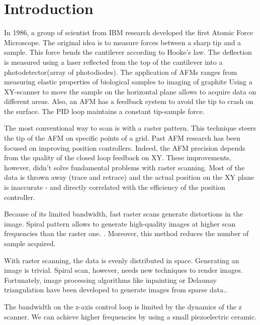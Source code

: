 \chapter{Introduction}

In 1986, a group of scientist from IBM research developed the first Atomic Force Microscope.\cite{binnig1986atomic} The original idea is to measure forces between a sharp tip and a sample. This force bends the cantilever according to Hooke's law. The deflection is measured using a laser reflected from the top of the cantilever into a photodetector(array of photodiodes). The application of AFMs ranges from measuring elastic properties of biological samples to imaging of graphite\cite{radmacher1997measuring} \cite{hansma1988scanning}
Using a XY-scanner to move the sample on the horizontal plane allows to acquire data on different areas. Also, an AFM has a feedback system to avoid the tip to crash on the surface. The PID loop maintains a constant tip-sample force. 

The most conventional way to scan is with a raster pattern. This technique steers the tip of the AFM on specific points of a grid. Past AFM research has been focused on improving position controllers. Indeed, the AFM precision depends from the quality of the closed loop feedback on XY. These improvements, however, didn't solve fundamental problems with raster scanning. Most of the data is thrown away (trace and retrace) and the actual position on the XY plane is inaccurate - and directly correlated with the efficiency of the position controller.

Because of its limited bandwidth, fast raster scans generate distortions in the image.\cite{yong2010high} Spiral pattern allows to generate high-quality images at higher scan frequencies than the raster one. \cite{mahmood2009fast}. Moreover, this method reduces the number of sample acquired. \cite{nonrasterdata}

With raster scanning, the data is evenly distributed in space. Generating an image is trivial. Spiral scan, however, needs new techniques to render images. Fortunately, image processing algorithms like inpainting \cite{richard2001fast} or Delaunay triangulation have been developed to generate images from sparse data.\cite{nonrasterdata}.

The bandwidth on the z-axis control loop is limited by the dynamics of the z scanner.\cite{jeong:093706} We can achieve higher frequencies by using a small piezoelectric ceramic.\cite{sulchek1999dual}

